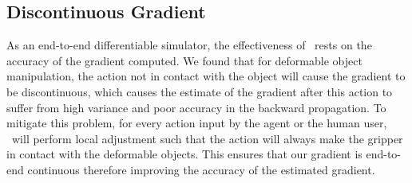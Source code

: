 \subsection{Discontinuous Gradient}

As an end-to-end differentiable simulator, the effectiveness of \algo\ rests on the accuracy of the gradient computed. We found that for deformable object manipulation, the action not in contact with the object will cause the gradient to be discontinuous, which causes the estimate of the gradient after this action to suffer from high variance and poor accuracy in the backward propagation. To mitigate this problem, for every action input by the agent or the human user, \algo\ will perform local adjustment such that the action will always make the gripper in contact with the deformable objects. This ensures that our gradient is end-to-end continuous therefore improving the accuracy of the estimated gradient.

